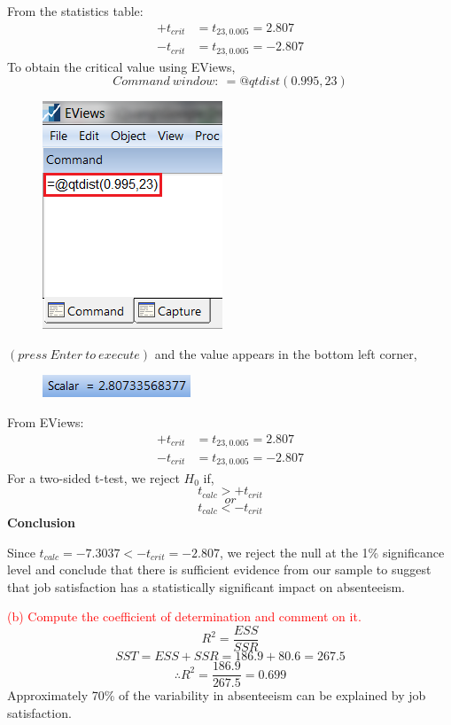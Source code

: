 \documentclass[12pt]{report}
\begin{document}
\vspace{-\baselineskip}
\noindent From the statistics table: \begin{align*}
+t_{crit} &= t_{23,0.005} = 2.807 \\
-t_{crit} &= t_{23,0.005} = -2.807
\end{align*}
\noindent To obtain the critical value using EViews,
$$Command\ window:\ =@qtdist(0.995,23)$$
\begin{figure}[H]
	\centering
	\includegraphics{tute6_q1_2}
\end{figure}
\vspace{-\baselineskip}\centering $(press\ Enter\ to\ execute)$
\justify and the value appears in the bottom left corner,
\begin{figure}[H]
	\centering
	\includegraphics{tute6_q1_3}
\end{figure}
\vspace{-\baselineskip}
\noindent From EViews: \begin{align*}
+t_{crit} &= t_{23,0.005} = 2.807 \\
-t_{crit} &= t_{23,0.005} = -2.807
\end{align*}
\noindent For a two-sided t-test, we reject $H_0$ if,
$$t_{calc} > +t_{crit}$$
$$or$$
$$t_{calc} < -t_{crit}$$
\noindent \textbf{Conclusion}

\noindent Since $t_{calc} = -7.3037 < -t_{crit} = -2.807$, we reject the null at the 1\% significance level and conclude that there is sufficient evidence from our sample to suggest that job satisfaction has a statistically significant impact on absenteeism.

\noindent \textcolor{red}{(b) Compute the coefficient of determination and comment on it.}
$$R^2 = \dfrac{ESS}{SSR}$$
$$SST = ESS + SSR = 186.9 + 80.6 = 267.5$$
$$\therefore R^2 = \dfrac{186.9}{267.5} = 0.699$$
\noindent Approximately 70\% of the variability in absenteeism can be explained by job satisfaction.
\end{document}
